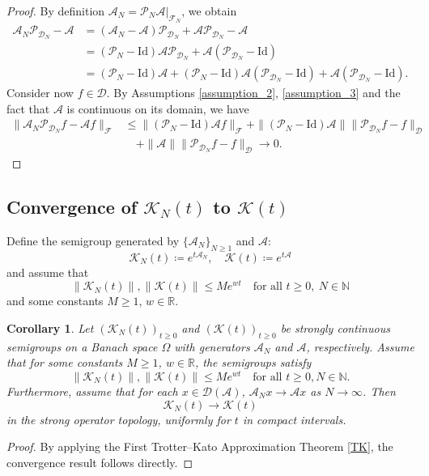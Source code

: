 \documentclass{article}[11]
\newtheorem{corollary}[theorem]{Corollary}
\begin{document}
	\begin{proof}
		By definition $\mathcal{A}_N = \mathcal{P}_N \mathcal{A} |_{\mathcal{F}_N}$, we obtain
		\begin{align*}
			\mathcal{A}_N \mathcal{P}_{\mathcal{D}_N} - \mathcal{A} &= (\mathcal{A}_N - \mathcal{A}) \mathcal{P}_{\mathcal{D}_N} + \mathcal{A} \mathcal{P}_{\mathcal{D}_N} - \mathcal{A} \\
			&= (\mathcal{P}_N - \mathrm{Id}) \mathcal{A} \mathcal{P}_{\mathcal{D}_N} + \mathcal{A} (\mathcal{P}_{\mathcal{D}_N} - \mathrm{Id}) \\
			&= (\mathcal{P}_N - \mathrm{Id}) \mathcal{A} + (\mathcal{P}_N - \mathrm{Id}) \mathcal{A} (\mathcal{P}_{\mathcal{D}_N} - \mathrm{Id}) + \mathcal{A} (\mathcal{P}_{\mathcal{D}_N} - \mathrm{Id}).
		\end{align*}	
		Consider now $f \in \mathcal{D}$. By Assumptions \ref{assumption_2}, \ref{assumption_3} and the fact that $\mathcal{A}$ is continuous on its domain, we have
		\begin{align*}
			\| \mathcal{A}_N \mathcal{P}_{\mathcal{D}_N} f - \mathcal{A} f \|_{\mathcal{F}} &\leq \| (\mathcal{P}_N - \mathrm{Id}) \mathcal{A} f \|_{\mathcal{F}} + \| (\mathcal{P}_N - \mathrm{Id}) \mathcal{A} \| \| \mathcal{P}_{\mathcal{D}_N} f - f \|_{\mathcal{D}} \\
			&\quad + \| \mathcal{A} \| \| \mathcal{P}_{\mathcal{D}_N} f - f \|_{\mathcal{D}} \to 0.
		\end{align*}	
	\end{proof}
	
	
	
	
	\subsection{Convergence of \(\mathcal{K}_N(t)\) to \(\mathcal{K}(t)\)}
	
	Define the semigroup generated by $\{\mathcal{A}_N\}_{N \geq 1}$ and $\mathcal{A}$:
	$$
	\mathcal{K}_N(t) \coloneqq e^{t\mathcal{A}_N}, \quad \mathcal{K}(t) \coloneqq e^{t\mathcal{A}}
	$$
	and assume that 
	$$
	\|\mathcal{K}_N(t)\|, \|\mathcal{K}(t)\| \leq Me^{wt} \quad \textrm{for all } t\geq0, \  N\in\mathbb{N}
	$$
	and some constants $M \geq 1$, $w \in \mathbb{R}$.
	
	\begin{corollary}
		Let $(\mathcal{K}_N(t))_{t\geq0}$ and $(\mathcal{K}(t))_{t\geq0}$ be strongly continuous semigroups on a Banach space $\Omega$ with generators $\mathcal{A}_N$ and $\mathcal{A}$, respectively. Assume that for some constants $M \geq 1$, $w \in \mathbb{R}$, the semigroups satisfy
		\[
		\|\mathcal{K}_N(t)\|, \|\mathcal{K}(t)\| \leq Me^{wt} \quad \text{for all } t \geq 0, N \in \mathbb{N}.
		\]
		Furthermore, assume that for each $x \in \mathcal{D}(\mathcal{A})$, $\mathcal{A}_N x \to \mathcal{A} x$ as $N \to \infty$. Then 
		$$
		\mathcal{K}_N(t) \to \mathcal{K}(t)
		$$
		in the strong operator topology, uniformly for $t$ in compact intervals.
	\end{corollary}
	\begin{proof}
		By applying the First Trotter--Kato Approximation Theorem \ref{TK}, the convergence result follows directly.
	\end{proof}
	
\end{document}
